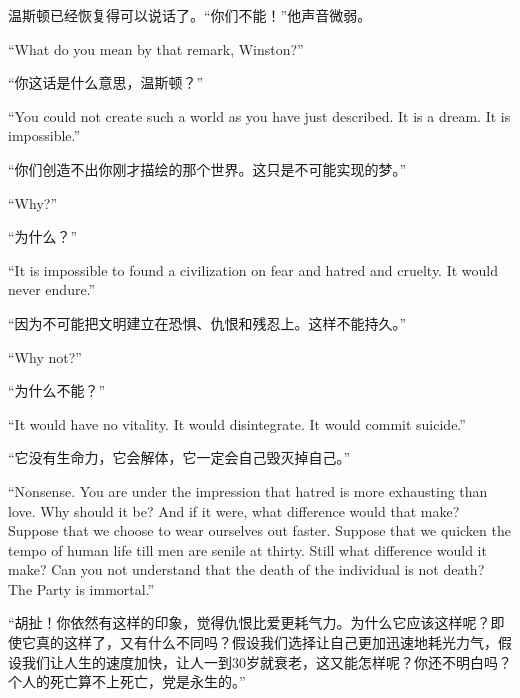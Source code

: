 \begin{paracol}{2}
\switchcolumn

温斯顿已经恢复得可以说话了。``你们不能！''他声音微弱。

\switchcolumn*

``What do you mean by that remark, Winston?''

\switchcolumn

``你这话是什么意思，温斯顿？''

\switchcolumn*

``You could not create such a world as you have just described. It is a
dream. It is impossible.''

\switchcolumn

``你们创造不出你刚才描绘的那个世界。这只是不可能实现的梦。''

\switchcolumn*

``Why?''

\switchcolumn

``为什么？''

\switchcolumn*

``It is impossible to found a civilization on fear and hatred and
cruelty. It would never endure.''

\switchcolumn

``因为不可能把文明建立在恐惧、仇恨和残忍上。这样不能持久。''

\switchcolumn*

``Why not?''

\switchcolumn

``为什么不能？''

\switchcolumn*

``It would have no vitality. It would disintegrate. It would commit
suicide.''

\switchcolumn

``它没有生命力，它会解体，它一定会自己毁灭掉自己。''

\switchcolumn*

``Nonsense. You are under the impression that hatred is more exhausting
than love. Why should it be? And if it were, what difference would that
make? Suppose that we choose to wear ourselves out faster. Suppose that
we quicken the tempo of human life till men are senile at thirty. Still
what difference would it make? Can you not understand that the death of
the individual is not death? The Party is immortal.''

\switchcolumn

``胡扯！你依然有这样的印象，觉得仇恨比爱更耗气力。为什么它应该这样呢？即使它真的这样了，又有什么不同吗？假设我们选择让自己更加迅速地耗光力气，假设我们让人生的速度加快，让人一到30岁就衰老，这又能怎样呢？你还不明白吗？个人的死亡算不上死亡，党是永生的。''


\end{paracol}
